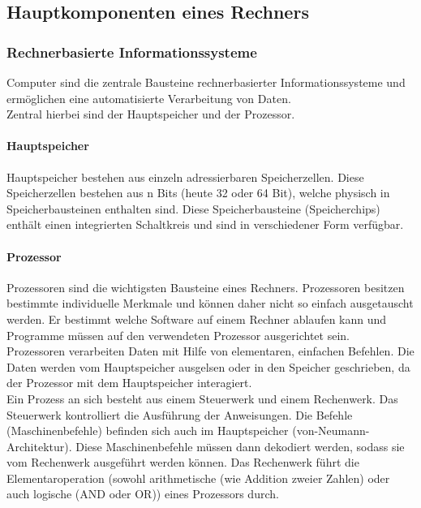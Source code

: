 \documentclass{article}
\begin{document}
\begin{adjustwidth}{2em}{2em}
\begin{adjustwidth}{2em}{2em}
			\subsection{Hauptkomponenten eines Rechners}
			\begin{adjustwidth}{1em}{}
				\subsubsection{Rechnerbasierte Informationssysteme}
				\begin{adjustwidth}{1em}{}
					Computer sind die zentrale Bausteine rechnerbasierter Informationssysteme und ermöglichen eine automatisierte Verarbeitung von Daten. \\
					Zentral hierbei sind der Hauptspeicher und der Prozessor.
					\paragraph{Hauptspeicher}
					\begin{adjustwidth}{1em}{}
						Hauptspeicher bestehen aus einzeln adressierbaren Speicherzellen. Diese Speicherzellen bestehen aus n Bits (heute 32 oder 64 Bit), welche physisch in Speicherbausteinen enthalten sind. Diese Speicherbausteine (Speicherchips) enthält einen integrierten Schaltkreis und sind in verschiedener Form verfügbar.
					\end{adjustwidth}
					\paragraph{Prozessor}
					\begin{adjustwidth}{1em}{}
						Prozessoren sind die wichtigsten Bausteine eines Rechners. Prozessoren besitzen bestimmte individuelle Merkmale und können daher nicht so einfach ausgetauscht werden. Er bestimmt welche Software auf einem Rechner ablaufen kann und Programme müssen auf den verwendeten Prozessor ausgerichtet sein. \\
						Prozessoren verarbeiten Daten mit Hilfe von elementaren, einfachen Befehlen. Die Daten werden vom Hauptspeicher ausgelsen oder in den Speicher geschrieben, da der Prozessor mit dem Hauptspeicher interagiert. \\
						Ein Prozess an sich besteht aus einem Steuerwerk und einem Rechenwerk. Das Steuerwerk kontrolliert die Ausführung der Anweisungen. Die Befehle (Maschinenbefehle) befinden sich auch im Hauptspeicher (von-Neumann-Architektur). Diese Maschinenbefehle müssen dann dekodiert werden, sodass sie vom Rechenwerk ausgeführt werden können. Das Rechenwerk führt die Elementaroperation (sowohl arithmetische (wie Addition zweier Zahlen) oder auch logische (AND oder OR)) eines Prozessors durch.
					\end{adjustwidth}
				\end{adjustwidth}

\end{adjustwidth}
\end{adjustwidth}
\end{adjustwidth}
\end{document}
